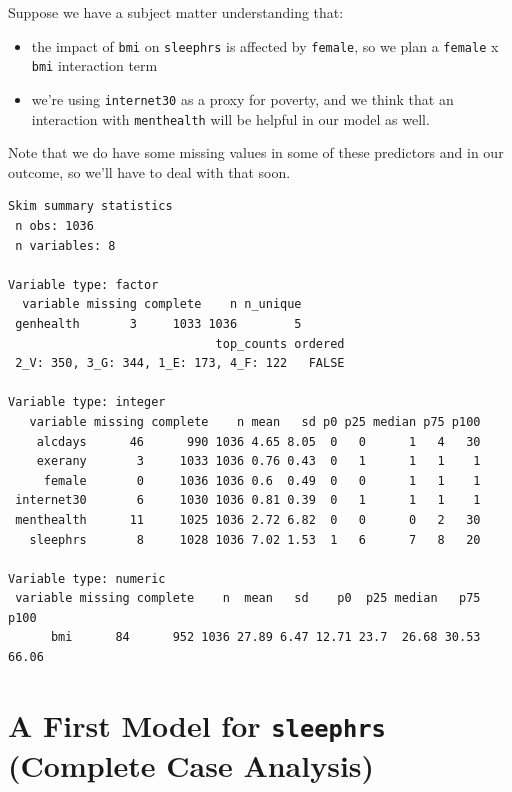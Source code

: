 \documentclass[]{book}
\newenvironment{Shaded}{\begin{snugshade}}{\end{snugshade}}
\newcommand{\KeywordTok}[1]{\textcolor[rgb]{0.13,0.29,0.53}{\textbf{#1}}}
\newcommand{\StringTok}[1]{\textcolor[rgb]{0.31,0.60,0.02}{#1}}
\newcommand{\OperatorTok}[1]{\textcolor[rgb]{0.81,0.36,0.00}{\textbf{#1}}}
\newcommand{\NormalTok}[1]{#1}
\providecommand{\tightlist}{%
  \setlength{\itemsep}{0pt}\setlength{\parskip}{0pt}}
\theoremstyle{definition}
\theoremstyle{definition}
\theoremstyle{definition}
\theoremstyle{remark}
\begin{document}
Suppose we have a subject matter understanding that:

\begin{itemize}
\tightlist
\item
  the impact of \texttt{bmi} on \texttt{sleephrs} is affected by
  \texttt{female}, so we plan a \texttt{female} x \texttt{bmi}
  interaction term
\item
  we're using \texttt{internet30} as a proxy for poverty, and we think
  that an interaction with \texttt{menthealth} will be helpful in our
  model as well.
\end{itemize}

Note that we do have some missing values in some of these predictors and
in our outcome, so we'll have to deal with that soon.

\begin{Shaded}
\end{Shaded}

\begin{verbatim}
Skim summary statistics
 n obs: 1036 
 n variables: 8 

Variable type: factor 
  variable missing complete    n n_unique
 genhealth       3     1033 1036        5
                             top_counts ordered
 2_V: 350, 3_G: 344, 1_E: 173, 4_F: 122   FALSE

Variable type: integer 
   variable missing complete    n mean   sd p0 p25 median p75 p100
    alcdays      46      990 1036 4.65 8.05  0   0      1   4   30
    exerany       3     1033 1036 0.76 0.43  0   1      1   1    1
     female       0     1036 1036 0.6  0.49  0   0      1   1    1
 internet30       6     1030 1036 0.81 0.39  0   1      1   1    1
 menthealth      11     1025 1036 2.72 6.82  0   0      0   2   30
   sleephrs       8     1028 1036 7.02 1.53  1   6      7   8   20

Variable type: numeric 
 variable missing complete    n  mean   sd    p0  p25 median   p75  p100
      bmi      84      952 1036 27.89 6.47 12.71 23.7  26.68 30.53 66.06
\end{verbatim}

\section{\texorpdfstring{A First Model for \texttt{sleephrs} (Complete
Case
Analysis)}{A First Model for sleephrs (Complete Case Analysis)}}\label{a-first-model-for-sleephrs-complete-case-analysis}
\end{document}
